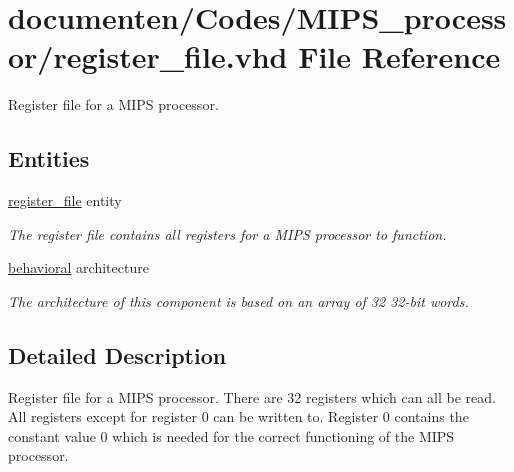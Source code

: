 \hypertarget{register__file_8vhd}{\section{documenten/\-Codes/\-M\-I\-P\-S\-\_\-processor/register\-\_\-file.vhd File Reference}
\label{register__file_8vhd}
}


Register file for a M\-I\-P\-S processor.  


\subsection*{Entities}
\begin{DoxyCompactItemize}
\item 
\hyperlink{classregister__file}{register\-\_\-file} entity
\begin{DoxyCompactList}\small\item\em The register file contains all registers for a M\-I\-P\-S processor to function. \end{DoxyCompactList}\item 
\hyperlink{classregister__file_1_1behavioral}{behavioral} architecture
\begin{DoxyCompactList}\small\item\em The architecture of this component is based on an array of 32 32-\/bit words. \end{DoxyCompactList}\end{DoxyCompactItemize}


\subsection{Detailed Description}
Register file for a M\-I\-P\-S processor. There are 32 registers which can all be read. All registers except for register 0 can be written to. Register 0 contains the constant value 0 which is needed for the correct functioning of the M\-I\-P\-S processor. 